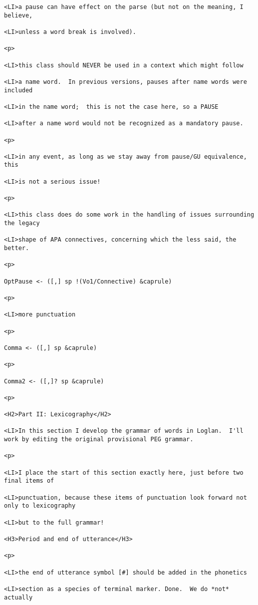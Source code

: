 \documentclass[12pt]{article}
\begin{document}
\begin{lstlisting}
<LI>a pause can have effect on the parse (but not on the meaning, I believe,

<LI>unless a word break is involved).

<p>

<LI>this class should NEVER be used in a context which might follow

<LI>a name word.  In previous versions, pauses after name words were included

<LI>in the name word;  this is not the case here, so a PAUSE

<LI>after a name word would not be recognized as a mandatory pause.

<p>

<LI>in any event, as long as we stay away from pause/GU equivalence, this

<LI>is not a serious issue!

<p>

<LI>this class does do some work in the handling of issues surrounding the legacy

<LI>shape of APA connectives, concerning which the less said, the better.

<p>

OptPause <- ([,] sp !(Vo1/Connective) &caprule)

<p>

<LI>more punctuation

<p>

Comma <- ([,] sp &caprule)

<p>

Comma2 <- ([,]? sp &caprule)

<p>

<H2>Part II: Lexicography</H2>

<LI>In this section I develop the grammar of words in Loglan.  I'll work by editing the original provisional PEG grammar.

<p>

<LI>I place the start of this section exactly here, just before two final items of

<LI>punctuation, because these items of punctuation look forward not only to lexicography

<LI>but to the full grammar!

<H3>Period and end of utterance</H3>

<p>

<LI>the end of utterance symbol [#] should be added in the phonetics

<LI>section as a species of terminal marker. Done.  We do *not* actually


\end{lstlisting}
\end{document}
